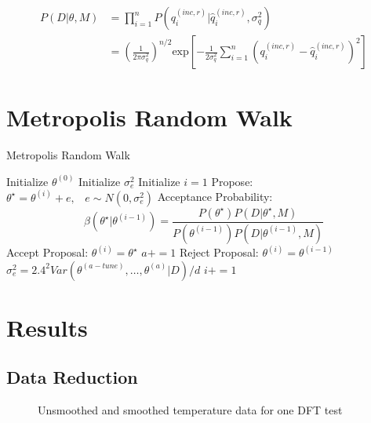 \documentclass[article]{proc}
\begin{document}
    \begin{align}\label{eq:likelihood_2}
        P(D| \theta, M) &= \prod_{i=1}^n P(q_i^{(inc,r)}| \hat{q}_i^{(inc,r)}, \sigma_q^2) \\
        &= \left(\frac{1}{2 \pi \sigma_q^2} \right)^{n/2} \text{exp} \left[-\frac{1}{2 \sigma_q^2} \sum_{i=1}^n \left(q_i^{(inc,r)} - \hat{q}_i^{(inc,r)} \right)^2 \right]
    \end{align}

\section{Metropolis Random Walk}

\begin{algorithm}
\caption{Metropolis Random Walk}\label{euclid}
\begin{algorithmic}[1]
\State Initialize $\theta^{(0)}$
\State Initialize $\sigma_e^2$
\State Initialize $i = 1$
    \State Propose: $\theta^{\star} = \theta^{(i)} + e, \hspace{10pt} e \sim N(0, \sigma_e^2)$
    \State Acceptance Probability: $$\beta (\theta^{\star} | \theta^{(i-1)}) = \frac{P(\theta^{\star})P(D|\theta^{\star},M)}{P(\theta^{(i-1)})P(D|\theta^{(i-1)}, M)}$$
            \State Accept Proposal: $\theta^{(i)} = \theta^{\star}$
            \State $a+=1$
        \Else
            \State Reject Proposal: $\theta^{(i)} = \theta^{(i-1)}$
        \EndIf
        \State $\sigma_e^2 = 2.4^2 Var(\theta^{(a-tune)}, \dots, \theta^{(a)}|D)/d$
    \EndWhile
    \State $i+=1$
\EndWhile
\end{algorithmic}
\end{algorithm}

\section{Results}

\subsection{Data Reduction}

\begin{figure}[b!]
    \centering
    \qquad
    \caption{Unsmoothed and smoothed temperature data for one DFT test}
    \label{fig:tc_data}
\end{figure}
\end{document}

